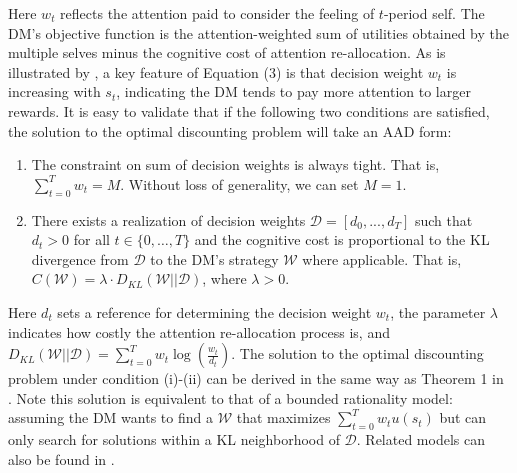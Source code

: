 \documentclass[
  12pt,
]{article}
\begin{document}
Here \(w_t\) reflects the attention paid to consider the feeling of
\(t\)-period self. The DM's objective function is the attention-weighted
sum of utilities obtained by the multiple selves minus the cognitive
cost of attention re-allocation. As is illustrated by
\citet{noor2022optimal,noor2024constrained}, a key feature of Equation
(3) is that decision weight \(w_t\) is increasing with \(s_t\),
indicating the DM tends to pay more attention to larger rewards. It is
easy to validate that if the following two conditions are satisfied, the
solution to the optimal discounting problem will take an AAD form:

\begin{enumerate}
\def\labelenumi{(\roman{enumi})}
\item
  The constraint on sum of decision weights is always tight. That is,
  \(\sum_{t=0}^Tw_t=M\). Without loss of generality, we can set \(M=1\).
\item
  There exists a realization of decision weights
  \(\mathcal{D}=[d_0,...,d_T]\) such that \(d_t>0\) for all
  \(t\in\{0,…,T\}\) and the cognitive cost is proportional to the KL
  divergence from \(\mathcal{D}\) to the DM's strategy \(\mathcal{W}\)
  where applicable. That is,
  \(C(\mathcal{W})= \lambda\cdot D_{KL}(\mathcal{W}||\mathcal{D})\),
  where \(\lambda>0\).
\end{enumerate}

Here \(d_t\) sets a reference for determining the decision weight
\(w_t\), the parameter \(\lambda\) indicates how costly the attention
re-allocation process is, and
\(D_{KL}(\mathcal{W}||\mathcal{D})=\sum_{t=0}^Tw_t\log(\frac{w_t}{d_t})\).
The solution to the optimal discounting problem under condition (i)-(ii)
can be derived in the same way as Theorem 1 in
\citet{matvejka2015rational}. Note this solution is equivalent to that
of a bounded rationality model: assuming the DM wants to find a
\(\mathcal{W}\) that maximizes \(\sum_{t=0}^Tw_tu(s_t)\) but can only
search for solutions within a KL neighborhood of \(\mathcal{D}\).
Related models can also be found in \citet{todorov2009efficient}.
\end{document}
